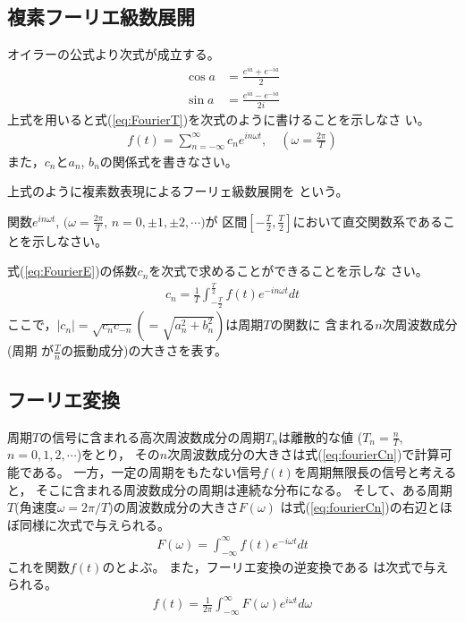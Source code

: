 \documentclass[twocolumn,11pt]{jarticle}
\begin{document}
\subsection{複素フーリエ級数展開}

\nquestion
オイラーの公式より次式が成立する。
\begin{align}
  \cos a&=\frac{e^{ia}+e^{-{ia}}}{2}\\
  \sin a&=\frac{e^{ia}-e^{-{ia}}}{2i}
\end{align}
上式を用いると式(\ref{eq:FourierT})を次式のように書けることを示しなさ
い。
\begin{align}
  f(t)=\sum_{n=-\infty}^{\infty} c_ne^{in\omega t},\quad(\omega=\frac{2\pi}{T})
  \label{eq:FourierE}
\end{align}
また，$c_n$と$a_n$, $b_n$の関係式を書きなさい。

\comment
上式のように複素数表現によるフーリェ級数展開を
という。

\nquestion
関数$e^{in\omega t}$, $(\omega=\frac{2\pi}{T}$, 
$n=0,\pm 1, \pm2, \cdots)$が
区間$[-\frac{T}{2},\frac{T}{2}]$において直交関数系であることを示しなさい。

\nquestion
式(\ref{eq:FourierE})の係数$c_n$を次式で求めることができることを示しな
さい。
\begin{align}
  \label{eq:fourierCn}
  c_n=\frac{1}{T}\int_{-\frac{T}{2}}^{\frac{T}{2}}f(t)e^{-in\omega t}dt
\end{align}
ここで，$|c_n|=\sqrt{c_nc_{-n}}(=\sqrt{a_n^2+b_n^2})$は周期$T$の関数に
含まれる$n$次周波数成分(周期 が$\frac{T}{n}$の振動成分)の大きさを表す。

\subsection{フーリエ変換}
周期$T$の信号に含まれる高次周波数成分の周期$T_n$は離散的な値
($T_n=\frac{n}{T}$, $n=0,1,2,\cdots$)をとり，
その$n$次周波数成分の大きさは式(\ref{eq:fourierCn})で計算可能である。
一方，一定の周期をもたない信号$f(t)$を周期無限長の信号と考えると，
そこに含まれる周波数成分の周期は連続な分布になる。
そして、ある周期$T$(角速度$\omega=2\pi/T$)の周波数成分の大きさ$F(\omega)$
は式(\ref{eq:fourierCn})の右辺とほぼ同様に次式で与えられる。
\begin{align}
  F(\omega)=\int_{-\infty}^{\infty}f(t)e^{-i\omega t}dt
  \label{eq:Fourier}
\end{align}
これを関数$f(t)$のとよぶ。
また，フーリエ変換の逆変換である
は次式で与えられる。
\begin{align}
  f(t)=\frac{1}{2\pi}\int_{-\infty}^{\infty}F(\omega)e^{i\omega t}d\omega
  \label{eq:inv-Fourier}
\end{align}
\end{document}

